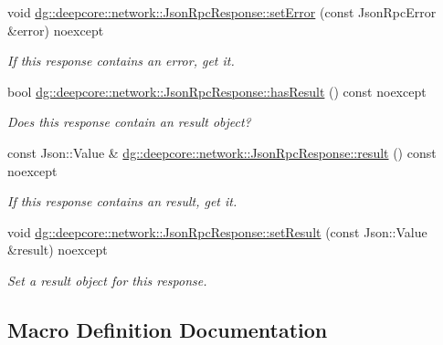 \begin{DoxyCompactItemize}
void \hyperlink{group___network_module_ga47913460de543d08ee67b2d263a49b37}{dg\+::deepcore\+::network\+::\+Json\+Rpc\+Response\+::set\+Error} (const Json\+Rpc\+Error \&error) noexcept
\begin{DoxyCompactList}\small\item\em If this response contains an error, get it. \end{DoxyCompactList}\item 
bool \hyperlink{group___network_module_ga6bce2bddf5eb24775a682dd8078d1392}{dg\+::deepcore\+::network\+::\+Json\+Rpc\+Response\+::has\+Result} () const noexcept
\begin{DoxyCompactList}\small\item\em Does this response contain an result object? \end{DoxyCompactList}\item 
const Json\+::\+Value \& \hyperlink{group___network_module_gaff7247fb07139f7e6f620020f3a00224}{dg\+::deepcore\+::network\+::\+Json\+Rpc\+Response\+::result} () const noexcept
\begin{DoxyCompactList}\small\item\em If this response contains an result, get it. \end{DoxyCompactList}\item 
void \hyperlink{group___network_module_ga70614bdc02d6aeca557c21644305a72a}{dg\+::deepcore\+::network\+::\+Json\+Rpc\+Response\+::set\+Result} (const Json\+::\+Value \&result) noexcept
\begin{DoxyCompactList}\small\item\em Set a result object for this response. \end{DoxyCompactList}\end{DoxyCompactItemize}


\subsection{Macro Definition Documentation}
